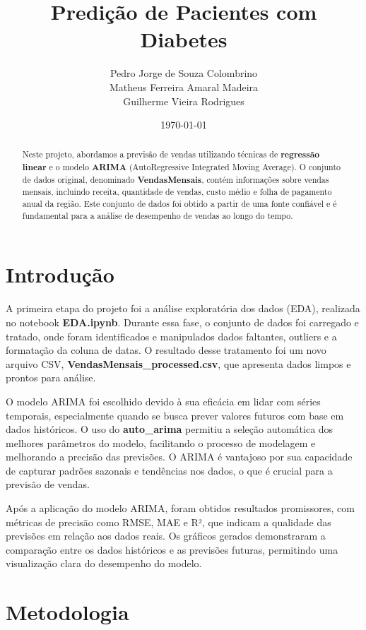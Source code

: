 \documentclass[a4paper,12pt]{article}
\title{Predição de Pacientes com Diabetes}
\author{Pedro Jorge de Souza Colombrino \\ Matheus Ferreira Amaral Madeira \\ Guilherme Vieira Rodrigues }
\date{\today}
\begin{document}
\maketitle

\begin{abstract}
    Neste projeto, abordamos a previsão de vendas utilizando técnicas de \textbf{regressão linear} e o modelo \textbf{ARIMA} (AutoRegressive Integrated Moving Average). O conjunto de dados original, denominado \textbf{VendasMensais}, contém informações sobre vendas mensais, incluindo receita, quantidade de vendas, custo médio e folha de pagamento anual da região. Este conjunto de dados foi obtido a partir de uma fonte confiável e é fundamental para a análise de desempenho de vendas ao longo do tempo.
\end{abstract}

\section{Introdução}

A primeira etapa do projeto foi a análise exploratória dos dados (EDA), realizada no notebook \textbf{EDA.ipynb}. Durante essa fase, o conjunto de dados foi carregado e tratado, onde foram identificados e manipulados dados faltantes, outliers e a formatação da coluna de datas. O resultado desse tratamento foi um novo arquivo CSV, \textbf{VendasMensais\_processed.csv}, que apresenta dados limpos e prontos para análise.

O modelo ARIMA foi escolhido devido à sua eficácia em lidar com séries temporais, especialmente quando se busca prever valores futuros com base em dados históricos. O uso do \textbf{auto\_arima} permitiu a seleção automática dos melhores parâmetros do modelo, facilitando o processo de modelagem e melhorando a precisão das previsões. O ARIMA é vantajoso por sua capacidade de capturar padrões sazonais e tendências nos dados, o que é crucial para a previsão de vendas.

Após a aplicação do modelo ARIMA, foram obtidos resultados promissores, com métricas de precisão como RMSE, MAE e R², que indicam a qualidade das previsões em relação aos dados reais. Os gráficos gerados demonstraram a comparação entre os dados históricos e as previsões futuras, permitindo uma visualização clara do desempenho do modelo.

\section{Metodologia}
\end{document}
